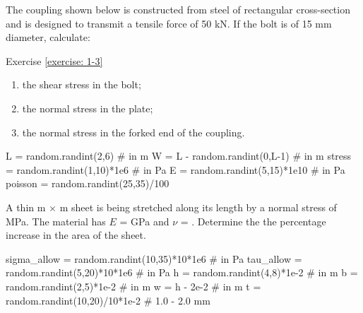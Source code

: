 \documentclass[
fontsize=10pt,
a4paper,
twosides=false,
open=any,
svgnames,
]{kaobook} %
\begin{document}
\begin{exercises}
  \item \label{exercise: 1-3} The coupling shown below is constructed from steel of rectangular cross-section and is designed to transmit a tensile force of 50 kN. If the bolt is of 15 mm diameter, calculate:

  \begin{marginfigure}
    \centering
    \caption{Exercise \ref{exercise: 1-3}}
  \end{marginfigure}

  \begin{enumerate}
  \item the shear stress in the bolt;
  \item the normal stress in the plate;
  \item the normal stress in the forked end of the coupling.
  \end{enumerate}

\begin{pycode}
L = random.randint(2,6) # in m
W = L - random.randint(0,L-1) # in m
stress = random.randint(1,10)*1e6 # in Pa
E = random.randint(5,15)*1e10 # in Pa
poisson = random.randint(25,35)/100
\end{pycode}

  \item A thin  m $\times$  m sheet is being stretched along its length by a normal stress of  MPa. The material has $E$ =  GPa and $\nu$ = . Determine the the percentage increase in the area of the sheet.

\begin{pycode}
sigma_allow = random.randint(10,35)*10*1e6 # in Pa
tau_allow = random.randint(5,20)*10*1e6 # in Pa
h = random.randint(4,8)*1e-2 # in m
b = random.randint(2,5)*1e-2 # in m
w = h - 2e-2 # in m
t = random.randint(10,20)/10*1e-2 # 1.0 - 2.0 mm
\end{pycode}


\end{exercises}
\end{document}
